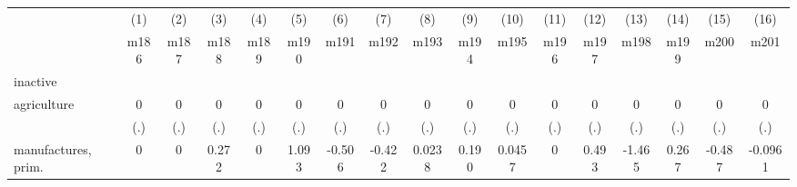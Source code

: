 {
\def\sym#1{\ifmmode^{#1}\else\(^{#1}\)\fi}
\begin{tabular}{l*{16}{c}}
\hline\hline
                    &\multicolumn{1}{c}{(1)}&\multicolumn{1}{c}{(2)}&\multicolumn{1}{c}{(3)}&\multicolumn{1}{c}{(4)}&\multicolumn{1}{c}{(5)}&\multicolumn{1}{c}{(6)}&\multicolumn{1}{c}{(7)}&\multicolumn{1}{c}{(8)}&\multicolumn{1}{c}{(9)}&\multicolumn{1}{c}{(10)}&\multicolumn{1}{c}{(11)}&\multicolumn{1}{c}{(12)}&\multicolumn{1}{c}{(13)}&\multicolumn{1}{c}{(14)}&\multicolumn{1}{c}{(15)}&\multicolumn{1}{c}{(16)}\\
                    &\multicolumn{1}{c}{m186}&\multicolumn{1}{c}{m187}&\multicolumn{1}{c}{m188}&\multicolumn{1}{c}{m189}&\multicolumn{1}{c}{m190}&\multicolumn{1}{c}{m191}&\multicolumn{1}{c}{m192}&\multicolumn{1}{c}{m193}&\multicolumn{1}{c}{m194}&\multicolumn{1}{c}{m195}&\multicolumn{1}{c}{m196}&\multicolumn{1}{c}{m197}&\multicolumn{1}{c}{m198}&\multicolumn{1}{c}{m199}&\multicolumn{1}{c}{m200}&\multicolumn{1}{c}{m201}\\
\hline
inactive            &                     &                     &                     &                     &                     &                     &                     &                     &                     &                     &                     &                     &                     &                     &                     &                     \\
agriculture         &           0         &           0         &           0         &           0         &           0         &           0         &           0         &           0         &           0         &           0         &           0         &           0         &           0         &           0         &           0         &           0         \\
                    &         (.)         &         (.)         &         (.)         &         (.)         &         (.)         &         (.)         &         (.)         &         (.)         &         (.)         &         (.)         &         (.)         &         (.)         &         (.)         &         (.)         &         (.)         &         (.)         \\
[1em]
manufactures, prim. &           0         &           0         &       0.272         &           0         &       1.093         &      -0.506         &      -0.422         &      0.0238         &       0.190         &      0.0457         &           0         &       0.493         &      -1.465         &       0.267         &      -0.487         &     -0.0961         \\

\end{tabular}}
